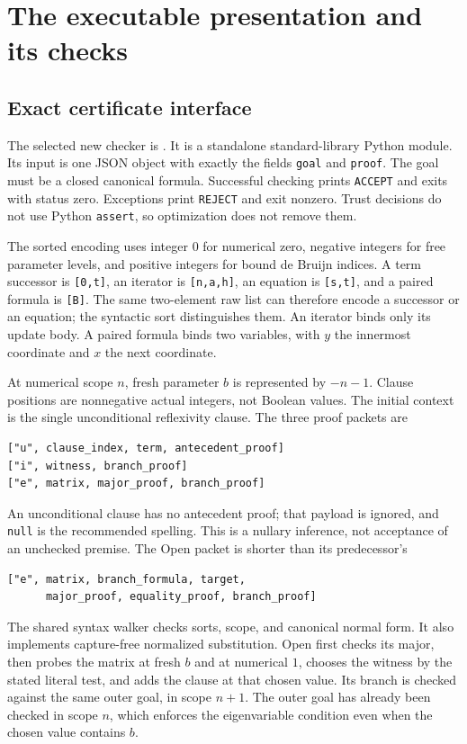 \documentclass[11pt,letterpaper]{article}
\theoremstyle{definition}
\begin{document}
\section{The executable presentation and its checks}
\label{sec:implementation}

\subsection{Exact certificate interface}

The selected new checker is .  It is a
standalone standard-library Python module.  Its input is one JSON object
with exactly the fields \texttt{goal} and \texttt{proof}.  The goal must
be a closed canonical formula.  Successful checking prints
\texttt{ACCEPT} and exits with status zero.  Exceptions print
\texttt{REJECT} and exit nonzero.  Trust decisions do not use Python
\texttt{assert}, so optimization does not remove them.

The sorted encoding uses integer $0$ for numerical zero, negative integers
for free parameter levels, and positive integers for bound de Bruijn
indices.  A term successor is \texttt{[0,t]}, an iterator is
\texttt{[n,a,h]}, an equation is \texttt{[s,t]}, and a paired formula is
\texttt{[B]}.  The same two-element raw list can therefore encode a
successor or an equation; the syntactic sort distinguishes them.  An
iterator binds only its update body.  A paired formula binds two variables,
with $y$ the innermost coordinate and $x$ the next coordinate.

At numerical scope $n$, fresh parameter $b$ is represented by $-n-1$.
Clause positions are nonnegative actual integers, not Boolean values.
The initial context is the single unconditional reflexivity clause.
The three proof packets are
\begin{verbatim}
["u", clause_index, term, antecedent_proof]
["i", witness, branch_proof]
["e", matrix, major_proof, branch_proof]
\end{verbatim}
An unconditional clause has no antecedent proof; that payload is ignored,
and \texttt{null} is the recommended spelling.  This is a nullary
inference, not acceptance of an unchecked premise.  The Open packet is
shorter than its predecessor's
\begin{verbatim}
["e", matrix, branch_formula, target,
      major_proof, equality_proof, branch_proof]
\end{verbatim}

The shared syntax walker checks sorts, scope, and canonical normal form.
It also implements capture-free normalized substitution.  Open first
checks its major, then probes the matrix at fresh $b$ and at numerical
$1$, chooses the witness by the stated literal test, and adds the clause
at that chosen value.  Its branch is checked against the same outer goal,
in scope $n+1$.  The outer goal has already been checked in scope $n$,
which enforces the eigenvariable condition even when the chosen value
contains $b$.
\end{document}

